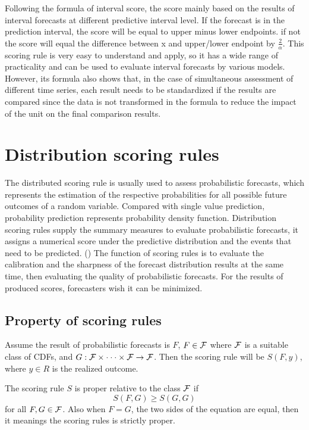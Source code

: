 \documentclass{monashthesis}
\theoremstyle{definition}
\theoremstyle{definition}
\theoremstyle{definition}
\theoremstyle{remark}
\begin{document}
Following the formula of interval score, the score mainly based on the
results of interval forecasts at different predictive interval level. If
the forecast is in the prediction interval, the score will be equal to
upper minus lower endpoints. if not the score will equal the difference
between x and upper/lower endpoint by \(\frac{2}{\alpha}\). This scoring
rule is very easy to understand and apply, so it has a wide range of
practicality and can be used to evaluate interval forecasts by various
models. However, its formula also shows that, in the case of
simultaneous assessment of different time series, each result needs to
be standardized if the results are compared since the data is not
transformed in the formula to reduce the impact of the unit on the final
comparison results.

\section{Distribution scoring rules}\label{distribution-scoring-rules}

The distributed scoring rule is usually used to assess probabilistic
forecasts, which represents the estimation of the respective
probabilities for all possible future outcomes of a random variable.
Compared with single value prediction, probability prediction represents
probability density function. Distribution scoring rules supply the
summary measures to evaluate probabilistic forecasts, it assigns a
numerical score under the predictive distribution and the events that
need to be predicted. (\textcite{GBR07}) The function of scoring rules
is to evaluate the calibration and the sharpness of the forecast
distribution results at the same time, then evaluating the quality of
probabilistic forecasts. For the results of produced scores, forecasters
wish it can be minimized.

\subsection{Property of scoring rules}\label{property-of-scoring-rules}

Assume the result of probabilistic forecasts is \(F\), \(F \in \cal{F}\)
where \(\cal{F}\) is a suitable class of CDFs, and
\(G:\cal{F\times\cdot\cdot\cdot\times F\to F}\). Then the scoring rule
will be \(S(F,y)\), where \(y \in R\) is the realized outcome.

The scoring rule \(S\) is proper relative to the class \(\cal{F}\) if
\[S(F,G)\geq S(G,G)\] for all \(F,G \in \cal{F}\). Also when \(F=G\),
the two sides of the equation are equal, then it meanings the scoring
rules is strictly proper.
\end{document}
